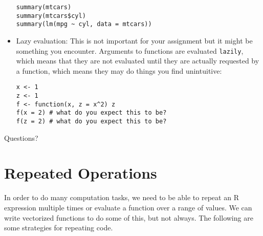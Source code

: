 \documentclass[a4paper,12pt]{article}
\begin{document}
\begin{itemize}
\begin{lstlisting}
summary(mtcars)
summary(mtcars$cyl)
summary(lm(mpg ~ cyl, data = mtcars))
\end{lstlisting}

\item Lazy evaluation: This is not important for your assignment but it might be something you encounter. Arguments to functions are evaluated \texttt{lazily}, which means that they are not evaluated until they are actually requested by a function, which means they may do things you find unintuitive:

\begin{lstlisting}
x <- 1
z <- 1
f <- function(x, z = x^2) z
f(x = 2) # what do you expect this to be?
f(z = 2) # what do you expect this to be?
\end{lstlisting}

\end{itemize}

Questions?


\section{Repeated Operations}

In order to do many computation tasks, we need to be able to repeat an R expression multiple times or evaluate a function over a range of values. We can write vectorized functions to do some of this, but not always. The following are some strategies for repeating code.
\end{document}

